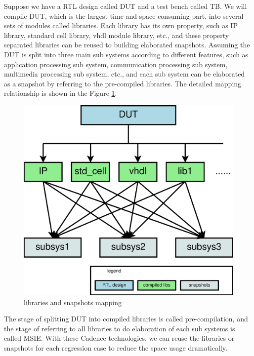 \documentclass[twoside]{article}
\begin{document}
\begin{multicols}{2}
  Suppose we have a RTL design called DUT and a test bench called TB. We will compile DUT, which is the largest time and space consuming part, into several sets of modules called libraries. Each library has its own property, such as IP library, standard cell library, vhdl module library, etc., and these property separated libraries can be reused to building elaborated snapshots. Assuming the DUT is split into three main sub systems according to different features, such as application processing sub system, communication processing sub system, multimedia processing sub system, etc., and each sub system can be elaborated as a snapshot by referring to the pre-compiled libraries. The detailed mapping relationship is shown in the Figure \ref{fig:pm_mapping}.
  \begin{figure}[H]
    \centering
    \includegraphics[width=\linewidth]{pm_mapping}
    \caption{libraries and snapshots mapping}
    \label{fig:pm_mapping}
  \end{figure}

  The stage of splitting DUT into compiled libraries is called pre-compilation, and the stage of referring to all libraries to do elaboration of each sub systems is called MSIE. With these Cadence technologies, we can reuse the libraries or snapshots for each regression case to reduce the space usage dramatically.


\end{multicols}
\end{document}
